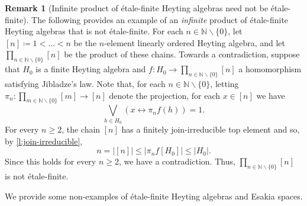 \documentclass[12pt]{amsart}
\theoremstyle{plain}
\theoremstyle{definition}
\newtheorem{remark}[theorem]{Remark}
\newcommand{\N}{\mathbb{N}}
\begin{document}
\begin{remark}[Infinite product of étale-finite Heyting algebras need not be étale-finite]\label{rem: infinite product of etale may fail to be etale}
    The following provides an example of an \emph{infinite} product of étale-finite Heyting algebras that is not étale-finite.
    For each $n \in \N \smallsetminus \{0\}$, let $[n] \coloneqq 1< \dots < n$ be the $n$-element linearly ordered Heyting algebra, and let $\prod_{n\in \N\smallsetminus\{0\}}[n]$ be the product of these chains. Towards a contradiction, suppose that $H_0$ is a finite Heyting algebra and $f \colon H_{0}\to \prod_{n\in \N\smallsetminus\{0\}}[n]$ a homomorphism satisfying Jibladze's law. Note that, for each $n\in \N \smallsetminus \{0\}$, letting $\pi_{n}\colon \prod_{m \in \N \smallsetminus \{0\}}[m]\to [n]$ denote the projection, for each $x\in [n]$ we have
    \begin{equation*}
         \bigvee_{h\in H_{0}}(x\leftrightarrow \pi_{n}f(h)) = 1. 
    \end{equation*}
    For every $n \geq 2$, the chain $[n]$ has a finitely join-irreducible top element and so, by \cref{l:join-irreducible},
    \[
    n = \lvert [n] \rvert \leq \lvert \pi_{n}f[H_{0}] \rvert \leq \lvert H_{0} \rvert.
    \]
    Since this holds for every $n \geq 2$, we have a contradiction.
    Thus, $\prod_{n\in \N\smallsetminus \{0\}}[n]$ is not étale-finite.
\end{remark}



We provide some non-examples of étale-finite Heyting algebras and Esakia spaces.
\end{document}
